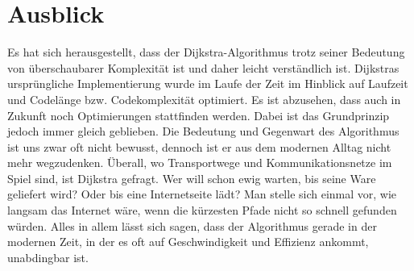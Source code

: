 \chapter{Ausblick}


Es hat sich herausgestellt, dass der Dijkstra-Algorithmus trotz seiner Bedeutung von überschaubarer Komplexität ist und daher leicht verständlich ist.
Dijkstras ursprüngliche Implementierung wurde im Laufe der Zeit im Hinblick auf Laufzeit und Codelänge bzw.  Codekomplexität optimiert. Es ist abzusehen, dass auch in Zukunft noch Optimierungen stattfinden werden.
Dabei ist das Grundprinzip jedoch immer gleich geblieben. Die Bedeutung und Gegenwart des Algorithmus ist uns zwar oft nicht bewusst, dennoch ist er aus dem modernen Alltag nicht mehr wegzudenken.
Überall, wo Transportwege und Kommunikationsnetze im Spiel sind, ist Dijkstra gefragt. Wer will schon ewig warten, bis seine Ware geliefert wird? Oder bis eine Internetseite lädt? Man stelle sich einmal vor, wie langsam das Internet wäre, wenn die kürzesten Pfade nicht so schnell gefunden würden.
Alles in allem lässt sich sagen, dass der Algorithmus gerade in der modernen Zeit, in der es oft auf Geschwindigkeit und Effizienz ankommt, unabdingbar ist.
